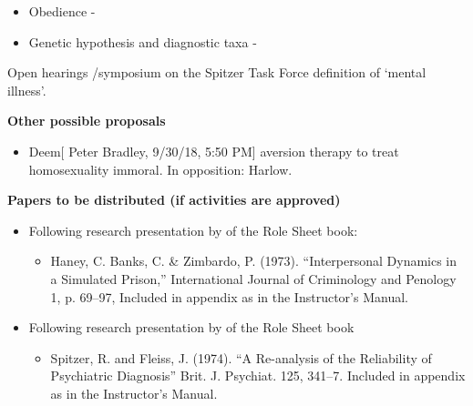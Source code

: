 \begin{refsection}
\begin{itemize}
\begin{itemize}
\item {}

\item {}

\end{itemize}

\item Obedience - 

\item Genetic hypothesis and diagnostic taxa - 

\end{itemize}

Open hearings \slash  symposium on the Spitzer Task Force definition of ‘mental illness’. 

\textbf{Other possible proposals}

\begin{itemize}
\item Deem[ Peter Bradley, 9\slash 30\slash 18, 5:50 PM] aversion therapy to treat homosexuality immoral. 
In opposition: Harlow.

\end{itemize}

\textbf{Papers to be distributed (if activities are approved)}

\begin{itemize}
\item Following research presentation by  of the Role Sheet book:

\begin{itemize}
\item Haney, C. Banks, C. \& Zimbardo, P. (1973). “Interpersonal Dynamics in a Simulated Prison,” International Journal of Criminology and Penology 1, p. 69--97, Included in appendix as  in the Instructor's Manual.

\end{itemize}

\item Following research presentation by  of the Role Sheet book

\begin{itemize}
\item Spitzer, R. and Fleiss, J. (1974). “A Re-analysis of the Reliability of Psychiatric Diagnosis” Brit. J. Psychiat. 125, 341--7. Included in appendix as  in the Instructor's Manual.


\end{itemize}
\end{itemize}
\end{refsection}
